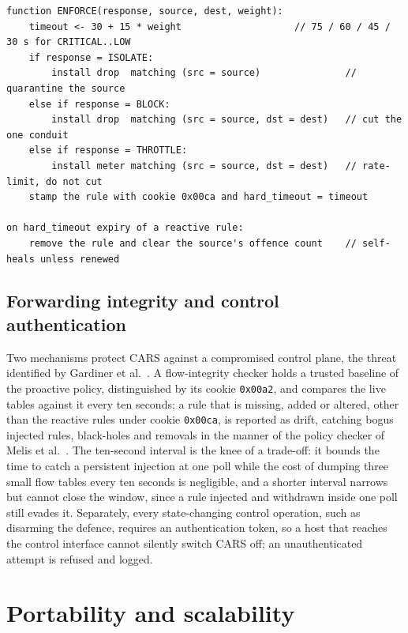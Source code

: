 \begin{lstlisting}[style=carspseudo,caption={Turning a response into an OpenFlow rule with a criticality-scaled timeout, and the self-heal on expiry that releases it unless the attack renews the detection.},label={lst:enforce}]
function ENFORCE(response, source, dest, weight):
    timeout <- 30 + 15 * weight                    // 75 / 60 / 45 / 30 s for CRITICAL..LOW
    if response = ISOLATE:
        install drop  matching (src = source)               // quarantine the source
    else if response = BLOCK:
        install drop  matching (src = source, dst = dest)   // cut the one conduit
    else if response = THROTTLE:
        install meter matching (src = source, dst = dest)   // rate-limit, do not cut
    stamp the rule with cookie 0x00ca and hard_timeout = timeout

on hard_timeout expiry of a reactive rule:
    remove the rule and clear the source's offence count    // self-heals unless renewed
\end{lstlisting}

\subsection{Forwarding integrity and control authentication}

Two mechanisms protect CARS against a compromised control plane, the threat identified by Gardiner et al.\ \cite{gardiner2021controller}. A flow-integrity checker holds a trusted baseline of the proactive policy, distinguished by its cookie \texttt{0x00a2}, and compares the live tables against it every ten seconds; a rule that is missing, added or altered, other than the reactive rules under cookie \texttt{0x00ca}, is reported as drift, catching bogus injected rules, black-holes and removals in the manner of the policy checker of Melis et al.\ \cite{melis2018policychecker}. The ten-second interval is the knee of a trade-off: it bounds the time to catch a persistent injection at one poll while the cost of dumping three small flow tables every ten seconds is negligible, and a shorter interval narrows but cannot close the window, since a rule injected and withdrawn inside one poll still evades it. Separately, every state-changing control operation, such as disarming the defence, requires an authentication token, so a host that reaches the control interface cannot silently switch CARS off; an unauthenticated attempt is refused and logged.

\section{Portability and scalability}
\label{sec:portability}

